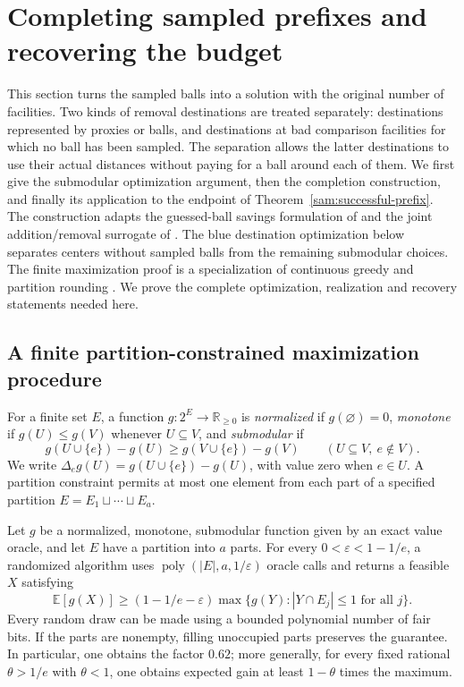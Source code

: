 \section{Completing sampled prefixes and recovering the budget}
\label{comp:section}

This section turns the sampled balls into a solution with the original
number of facilities.  Two kinds of removal destinations are treated
separately: destinations represented by proxies or balls, and destinations
at bad comparison facilities for which no ball has been sampled.  The
separation allows the latter destinations to use their actual distances
without paying for a ball around each of them.  We first give the
submodular optimization argument, then the completion construction, and
finally its application to the endpoint of Theorem~\ref{sam:successful-prefix}.
The construction adapts the guessed-ball savings formulation of
\cite[Section~2.3]{CGKLL2019} and the joint addition/removal surrogate
of \cite[Section~4.6]{CGLSS2026}.  The blue destination optimization
below separates centers without sampled balls from the remaining
submodular choices.  The finite maximization proof is a specialization
of continuous greedy and partition rounding
\cite[Theorem~1.1 and Section~3.3]{CCPV2011}.  We prove the complete
optimization, realization and recovery statements needed here.

\subsection{A finite partition-constrained maximization procedure}

For a finite set $E$, a function $g:2^E\to\mathbb R_{\ge0}$ is
\emph{normalized} if $g(\varnothing)=0$, \emph{monotone} if
$g(U)\le g(V)$ whenever $U\subseteq V$, and \emph{submodular} if
\[
 g(U\cup\{e\})-g(U)\ge g(V\cup\{e\})-g(V)
 \qquad(U\subseteq V,\ e\notin V).
\]
We write $\Delta_e g(U)=g(U\cup\{e\})-g(U)$, with value zero when
$e\in U$.  A partition constraint permits at most one element from each
part of a specified partition $E=E_1\sqcup\cdots\sqcup E_a$.

\begin{lemma}
\label{comp:partition-max}
Let $g$ be a normalized, monotone, submodular function given by an exact
value oracle, and let $E$ have a partition into $a$ parts.  For every
$0<\varepsilon<1-1/e$, a randomized algorithm uses
$\operatorname{poly}(|E|,a,1/\varepsilon)$ oracle calls and returns a
feasible $X$ satisfying
\[
 \mathbb E[g(X)]\ge(1-1/e-\varepsilon)
       \max\{g(Y): |Y\cap E_j|\le1\text{ for all }j\}.
\]
Every random draw can be made using a bounded polynomial number of fair
bits.  If the parts are nonempty, filling unoccupied parts preserves the
guarantee.  In particular, one obtains the factor $0.62$; more generally,
for every fixed rational $\theta>1/e$ with $\theta<1$, one obtains
expected gain at least $1-\theta$ times the maximum.
\end{lemma}


